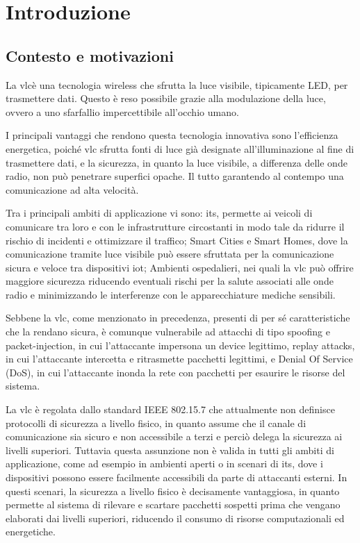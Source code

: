\chapter{Introduzione}
\label{cap:introduzione}

\section{Contesto e motivazioni}
La \gls{vlc}\glsfirstoccur è una tecnologia wireless che sfrutta la luce visibile, tipicamente LED, per trasmettere dati. Questo è reso possibile grazie alla modulazione della luce, ovvero a uno sfarfallio impercettibile all'occhio umano.

I principali vantaggi che rendono questa tecnologia innovativa sono l'efficienza energetica, poiché \gls{vlc} sfrutta fonti di luce già designate all'illuminazione al fine di trasmettere dati, e la sicurezza, in quanto la luce visibile, a differenza delle onde radio, non può penetrare superfici opache. Il tutto garantendo al contempo una comunicazione ad alta velocità.

Tra i principali ambiti di applicazione vi sono: \gls{its}\glsfirstoccur, permette ai veicoli di comunicare tra loro e con le infrastrutture circostanti in modo tale da ridurre il rischio di incidenti e ottimizzare il traffico; Smart Cities e Smart Homes, dove la comunicazione tramite luce visibile può essere sfruttata per la comunicazione sicura e veloce tra dispositivi \gls{iot}\glsfirstoccur; Ambienti ospedalieri, nei quali la \gls{vlc} può offrire maggiore sicurezza riducendo eventuali rischi per la salute associati alle onde radio e minimizzando le interferenze con le apparecchiature mediche sensibili.

Sebbene la \gls{vlc}, come menzionato in precedenza, presenti di per sé caratteristiche che la rendano sicura, è comunque vulnerabile ad attacchi di tipo spoofing e packet-injection, in cui l'attaccante impersona un device legittimo, replay attacks, in cui l'attaccante intercetta e ritrasmette pacchetti legittimi, e Denial Of Service (DoS), in cui l'attaccante inonda la rete con pacchetti per esaurire le risorse del sistema.

La \gls{vlc} è regolata dallo standard IEEE 802.15.7 che attualmente non definisce protocolli di sicurezza a livello fisico, in quanto assume che il canale di comunicazione sia sicuro e non accessibile a terzi e perciò delega la sicurezza ai livelli superiori. Tuttavia questa assunzione non è valida in tutti gli ambiti di applicazione, come ad esempio in ambienti aperti o in scenari di \gls{its}, dove i dispositivi possono essere facilmente accessibili da parte di attaccanti esterni.
In questi scenari, la sicurezza a livello fisico è decisamente vantaggiosa, in quanto permette al sistema di rilevare e scartare pacchetti sospetti prima che vengano elaborati dai livelli superiori, riducendo il consumo di risorse computazionali ed energetiche.

